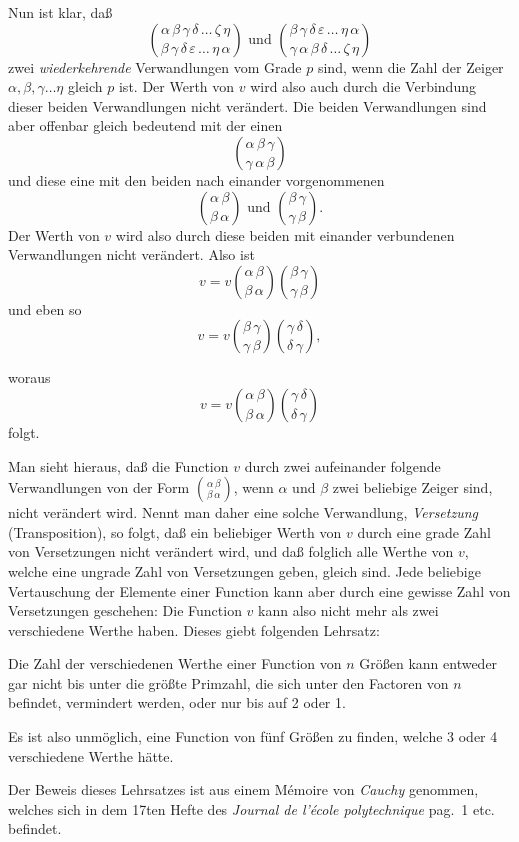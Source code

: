 \documentclass{article}
\begin{document}
Nun ist klar, daß
\[ \binom{\alpha\,\beta\,\gamma\,\delta\,\ldots\,\zeta\,\eta}{\beta\,\gamma\,\delta\,\varepsilon\,\ldots\,\eta\,\alpha} \text{ und } \binom{\beta\,\gamma\,\delta\,\varepsilon\,\ldots\,\eta\,\alpha}{\gamma\,\alpha\,\beta\,\delta\,\ldots\,\zeta\,\eta} \]
zwei \emph{wiederkehrende} Verwandlungen vom Grade $p$ sind, wenn die Zahl der Zeiger $\alpha, \beta, \gamma \ldots \eta$ gleich $p$ ist. Der Werth von $v$ wird also auch durch die Verbindung dieser beiden Verwandlungen nicht verändert. Die beiden Verwandlungen sind aber offenbar gleich bedeutend mit der einen
\[ \binom{\alpha\,\beta\,\gamma}{\gamma\,\alpha\,\beta} \]
und diese eine mit den beiden nach einander vorgenommenen
\[ \binom{\alpha\,\beta}{\beta\,\alpha} \text{ und } \binom{\beta\,\gamma}{\gamma\,\beta}. \]
Der Werth von $v$ wird also durch diese beiden mit einander verbundenen Verwandlungen nicht verändert. Also ist
\[ v = v\binom{\alpha\,\beta}{\beta\,\alpha}\binom{\beta\,\gamma}{\gamma\,\beta} \]
und eben so
\[ v = v\binom{\beta\,\gamma}{\gamma\,\beta}\binom{\gamma\,\delta}{\delta\,\gamma}, \]

woraus
\[ v = v\binom{\alpha\,\beta}{\beta\,\alpha}\binom{\gamma\,\delta}{\delta\,\gamma} \]
folgt.

Man sieht hieraus, daß die Function $v$ durch zwei aufeinander folgende Verwandlungen von der Form $\binom{\alpha\,\beta}{\beta\,\alpha}$, wenn $\alpha$ und $\beta$ zwei beliebige Zeiger sind, nicht verändert wird. Nennt man daher eine solche Verwandlung, \emph{Versetzung} (Transposition), so folgt, daß ein beliebiger Werth von $v$ durch eine grade Zahl von Versetzungen nicht verändert wird, und daß folglich alle Werthe von $v$, welche eine ungrade Zahl von Versetzungen geben, gleich sind. Jede beliebige Vertauschung der Elemente einer Function kann aber durch eine gewisse Zahl von Versetzungen geschehen: Die Function $v$ kann also nicht mehr als zwei verschiedene Werthe haben. Dieses giebt folgenden Lehrsatz:

Die Zahl der verschiedenen Werthe einer Function von $n$ Größen kann entweder gar nicht bis unter die größte Primzahl, die sich unter den Factoren von $n$ befindet, vermindert werden, oder nur bis auf 2 oder 1.

Es ist also unmöglich, eine Function von fünf Größen zu finden, welche 3 oder 4 verschiedene Werthe hätte.

Der Beweis dieses Lehrsatzes ist aus einem Mémoire von \emph{Cauchy} genommen, welches sich in dem 17ten Hefte des \emph{Journal de l'école polytechnique} pag.\ 1 etc. befindet.
\end{document}
